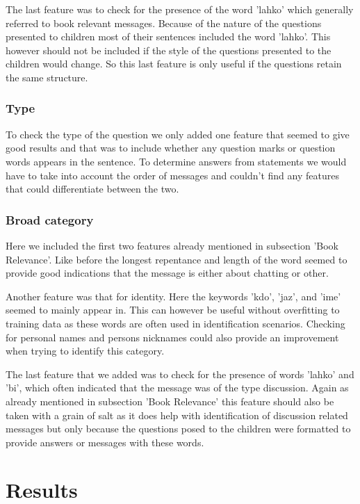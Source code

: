 \documentclass[11pt,a4paper]{article}
\begin{document}
The last feature was to check for the presence of the word 'lahko' which generally referred to book relevant messages.
Because of the nature of the questions presented to children most of their sentences included the word 'lahko'.
This however should not be included if the style of the questions presented to the children would change.
So this last feature is only useful if the questions retain the same structure.

\subsubsection{Type}

To check the type of the question we only added one feature that seemed to give good results and that was to include whether any question marks or question words appears in the sentence.
To determine answers from statements we would have to take into account the order of messages and couldn't find any features that could differentiate between the two.

\subsubsection{Broad category}

Here we included the first two features already mentioned in subsection 'Book Relevance'.
Like before the longest repentance and length of the word seemed to provide good indications that the message is either about chatting or other.

Another feature was that for identity.
Here the keywords 'kdo', 'jaz', and 'ime' seemed to mainly appear in.
This can however be useful without overfitting to training data as these words are often used in identification scenarios.
Checking for personal names and persons nicknames could also provide an improvement when trying to identify this category.

The last feature that we added was to check for the presence of words 'lahko' and 'bi', which often indicated that the message was of the type discussion.
Again as already mentioned in subsection 'Book Relevance' this feature should also be taken with a grain of salt as it does help with identification of discussion related messages but only because the questions posed to the children were formatted to provide answers or messages with these words. 

\section{Results} 
\end{document}
